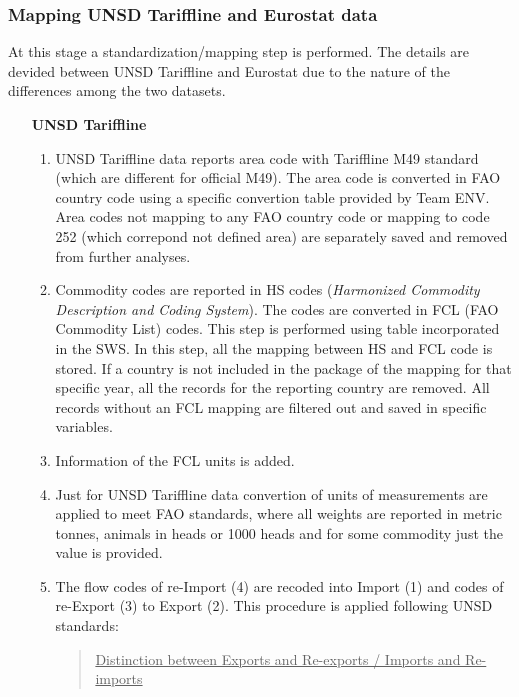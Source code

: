 \documentclass[nojss]{jss}\usepackage[]{graphicx}\usepackage[]{color}
\begin{document}
\subsubsection{Mapping UNSD Tariffline and Eurostat data}
At this stage a standardization/mapping step is performed. The details are devided between UNSD Tariffline and Eurostat due to the nature of the differences among the two datasets.
\begin{itemize}
\item [\bf{UNSD Tariffline}]
\begin{enumerate}
\item UNSD Tariffline data reports area code with Tariffline M49 standard (which are different for official M49). The area code is converted in FAO country code using a specific convertion table provided by Team ENV. Area codes not mapping to any FAO country code or mapping to code 252 (which correpond not defined area) are separately saved and removed from further analyses.
\item Commodity codes are reported in HS codes ({\it Harmonized Commodity Description and Coding System}). The codes are converted in FCL (FAO Commodity List) codes. This step is performed using table incorporated in the SWS. In this step, all the mapping between HS and FCL code is stored. If a country is not included in the package of the mapping for that specific year, all the records for the reporting country are removed. All records without an FCL mapping are filtered out and saved in specific variables.
\item Information of the FCL units is added.
\item Just for UNSD Tariffline data convertion of units of measurements are applied to meet FAO standards, where all weights are reported in metric tonnes, animals in heads or 1000 heads and for some commodity just the value is provided.
\item The flow codes of re-Import (4) are recoded into Import (1) and codes of re-Export (3) to Export (2). This procedure is applied following UNSD standards:
\begin{quote}
\underline{Distinction between Exports and Re-exports / Imports and Re-imports}\\

\end{quote}
\end{enumerate}
\end{itemize}
\end{document}
